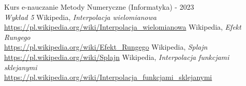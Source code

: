 \documentclass{article}
\begin{document}
\renewcommand{\refname}{Źródła}
\begin{thebibliography}{100}
    Kurs e-nauczanie Metody Numeryczne (Informatyka) - 2023\\
    \textit{Wykład 5}
    Wikipedia, \textit{Interpolacja wielomianowa} \\
    \url{https://pl.wikipedia.org/wiki/Interpolacja_wielomianowa}
    Wikipedia, \textit{Efekt Rungego} \\
    \url{https://pl.wikipedia.org/wiki/Efekt_Rungego}
    Wikipedia, \textit{Splajn} \\
    \url{https://pl.wikipedia.org/wiki/Splajn}
    Wikipedia, \textit{Interpolacja funkcjami sklejanymi} \\
    \url{https://pl.wikipedia.org/wiki/Interpolacja_funkcjami_sklejanymi}

\end{thebibliography}
\end{document}
